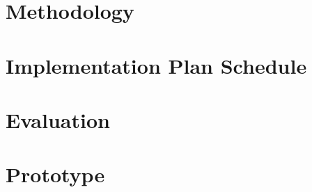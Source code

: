 \section{Methodology}

\section{Implementation Plan Schedule}

\section{Evaluation}

\section{Prototype}
